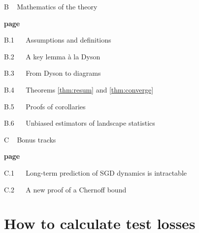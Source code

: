 \documentclass[openany, notitlepage, justified]{tufte-book}
\theoremstyle{plain}
\theoremstyle{definition}
\begin{document}
    {\bf
    \par\noindent B ~ Mathematics of the theory}                            \hfill {\bf page \pageref{appendix:math}}
    \par\indent     B.1 ~~ Assumptions and definitions                      \hfill \pageref{appendix:assumptions}
    \par\indent     B.2 ~~ A key lemma \`a la Dyson                         \hfill \pageref{appendix:key-lemma}
    \par\indent     B.3 ~~ From Dyson to diagrams                           \hfill \pageref{appendix:toward-diagrams}
    \par\indent     B.4 ~~ Theorems \ref{thm:resum} and \ref{thm:converge}  \hfill \pageref{appendix:resum}
    \par\indent     B.5 ~~ Proofs of corollaries                            \hfill \pageref{appendix:corollaries}
    \par\indent     B.6 ~~ Unbiased estimators of landscape statistics      \hfill \pageref{appendix:bessel}

    {\bf
    \par\noindent C ~ Bonus tracks}                                         \hfill {\bf page \pageref{appendix:bonus}}
    \par\indent     C.1 ~~ Long-term prediction of SGD dynamics is intractable  \hfill \pageref{appendix:pspace}
    \par\indent     C.2 ~~ A new proof of a Chernoff bound                  \hfill \pageref{appendix:chernoff}

\renewcommand{\thechapter}{\Alph{chapter}}


\chapter{How to calculate test losses}                   \label{appendix:tutorial}
\end{document}
